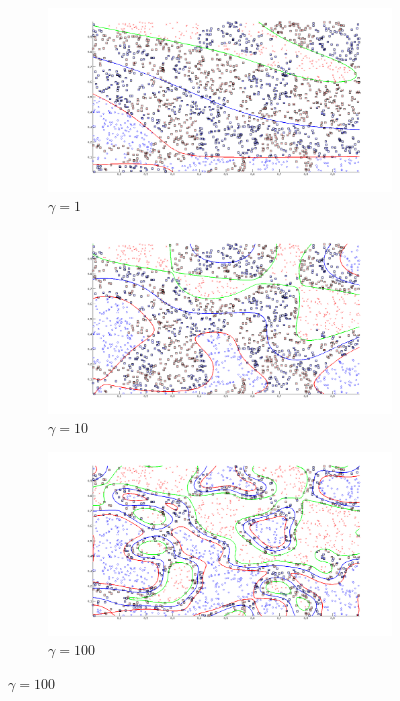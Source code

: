 \documentclass[letterpaper,10pt]{article} %
\begin{document}
\begin{figure}[h]
\centering
\begin{subfigure}[b]{\textwidth}
\includegraphics[width=\textwidth]{figs/p2-1a}
\caption{$\gamma = 1$}
\label{fig:p2a}
\end{subfigure}%

\begin{subfigure}[b]{\textwidth}
\includegraphics[width=\textwidth]{figs/p2-1b}
\caption{$\gamma = 10$}
\label{fig:p2b}
\end{subfigure}

\begin{subfigure}[b]{\textwidth}
\includegraphics[width=\textwidth]{figs/p2-1c}
\caption{$\gamma = 100$}
\label{fig:p2c}
\end{subfigure}


\end{figure}
\end{document}
